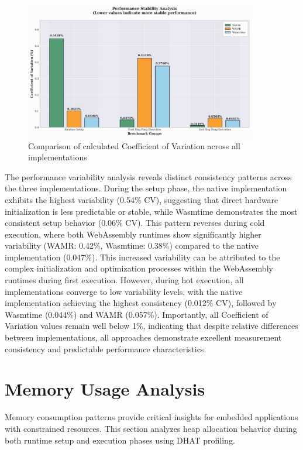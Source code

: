 \begin{figure}[h]
    \centering
    \includegraphics[width=0.9\textwidth]{images/variability-comparison}
    \caption{Comparison of calculated Coefficient of Variation across all implementations}
    \label{fig:variability-comparison}
\end{figure}

The performance variability analysis reveals distinct consistency patterns across the three implementations. During the setup phase, the native implementation exhibits the highest variability (0.54\% CV), suggesting that direct hardware initialization is less predictable or stable, while Wasmtime demonstrates the most consistent setup behavior (0.06\% CV). This pattern reverses during cold execution, where both WebAssembly runtimes show significantly higher variability (WAMR: 0.42\%, Wasmtime: 0.38\%) compared to the native implementation (0.047\%). This increased variability can be attributed to the complex initialization and optimization processes within the WebAssembly runtimes during first execution. However, during hot execution, all implementations converge to low variability levels, with the native implementation achieving the highest consistency (0.012\% CV), followed by Wasmtime (0.044\%) and WAMR (0.057\%). Importantly, all Coefficient of Variation values remain well below 1\%, indicating that despite relative differences between implementations, all approaches demonstrate excellent measurement consistency and predictable performance characteristics.

\section{Memory Usage Analysis}
\label{sec:eval-memory}

Memory consumption patterns provide critical insights for embedded applications with constrained resources. This section analyzes heap allocation behavior during both runtime setup and execution phases using DHAT profiling.

